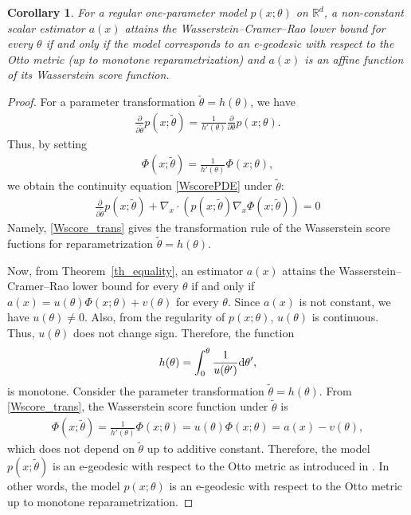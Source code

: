 \documentclass[11pt, a4paper]{article}
\newtheorem{corollary}{Corollary}
\begin{document}
\begin{corollary}\label{cor_geodesic}
	For a regular one-parameter model $p(x; \theta)$ on $\mathbb{R}^d$, a non-constant scalar estimator $a(x)$ attains the Wasserstein--Cramer--Rao lower bound for every $\theta$ if and only if the model corresponds to an e-geodesic with respect to the Otto metric (up to monotone reparametrization) and $a(x)$ is an affine function of its Wasserstein score function.
\end{corollary}
\begin{proof}
	For a parameter transformation $\widetilde{\theta}=h(\theta)$, we have
	\begin{align*}
		\frac{\partial}{\partial \widetilde{\theta}} p(x;\widetilde{\theta}) = \frac{1}{h'(\theta)} \frac{\partial}{\partial \theta} p(x;\theta).
	\end{align*}
	Thus, by setting
	\begin{align}\label{Wscore_trans}
		\Phi(x;\widetilde{\theta}) = \frac{1}{h'(\theta)} \Phi(x;{\theta}),
	\end{align}
	we obtain the continuity equation \eqref{WscorePDE} under $\widetilde{\theta}$:
	\begin{align*}
		\frac{\partial}{\partial \widetilde{\theta}} p(x;\widetilde{\theta}) + \nabla_x \cdot \left( p(x;\widetilde{\theta}) \nabla_x \Phi(x;\widetilde{\theta}) \right) = 0
	\end{align*}
	Namely, \eqref{Wscore_trans} gives the transformation rule of the Wasserstein score fuctions for reparametrization $\widetilde{\theta}=h(\theta)$.
	
	Now, from Theorem~\ref{th_equality}, an estimator $a(x)$ attains the Wasserstein--Cramer--Rao lower bound for every $\theta$ if and only if $a(x) = u(\theta)\Phi(x; \theta)  + v(\theta)$ for every $\theta$.
	Since $a(x)$ is not constant, we have $u(\theta) \neq 0$.
	Also, from the regularity of $p(x; \theta)$, $u(\theta)$ is continuous.
	Thus, $u(\theta)$ does not change sign.
	Therefore, the function
	\begin{align*}
		h(\theta) = \int_0^{\theta} \frac{1}{u(\theta')} {\rm d} \theta',
	\end{align*}
	is monotone.
	Consider the parameter transformation $\widetilde{\theta}=h(\theta)$.
	From \eqref{Wscore_trans}, the Wasserstein score function under $\widetilde{\theta}$ is
	\begin{align*}
		\Phi(x;\widetilde{\theta}) = \frac{1}{h'(\theta)} \Phi(x;{\theta}) = u(\theta) \Phi(x;{\theta}) = a(x)-v(\theta),
	\end{align*}
	which does not depend on $\widetilde{\theta}$ up to additive constant.
	Therefore, the model $p(x;\widetilde{\theta})$ is an e-geodesic with respect to the Otto metric as introduced in \cite{ay2024information}.
	In other words, the model $p(x;\theta)$ is an e-geodesic with respect to the Otto metric up to monotone reparametrization.
\end{proof}
\end{document}
